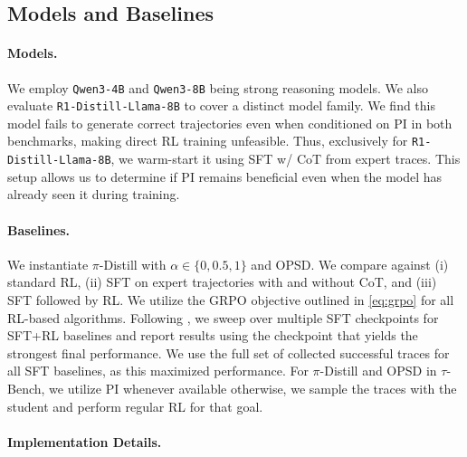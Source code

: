 \documentclass[]{servicenow} %
\begin{document}
 
\subsection{Models and Baselines}
\paragraph{Models.}We employ \texttt{Qwen3-4B} and \texttt{Qwen3-8B} \citep{yang2025qwen3technicalreport} being strong reasoning models. We also evaluate \texttt{R1-Distill-Llama-8B} to cover a distinct model family. We find this model fails to generate correct trajectories even when conditioned on PI in both benchmarks, making direct RL training unfeasible. Thus, exclusively for \texttt{R1-Distill-Llama-8B}, we warm-start it using SFT w/ CoT from expert traces. This setup allows us to determine if PI remains beneficial even when the model has already seen it during training.

\paragraph{Baselines.} We instantiate $\pi$-Distill with $\alpha \in \{0, 0.5, 1\}$ and OPSD. We compare against (i) standard RL, (ii) SFT on expert trajectories with and without CoT, and (iii) SFT followed by RL. We utilize the GRPO objective outlined in \cref{eq:grpo} for all RL-based algorithms. Following \citet{vattikonda2025trainllmwebagent}, we sweep over multiple SFT checkpoints for SFT+RL baselines and report results using the checkpoint that yields the strongest final performance. We use the full set of collected successful traces for all SFT baselines, as this maximized performance. For $\pi$-Distill and OPSD in $\tau$-Bench, we utilize PI whenever available otherwise, we sample the traces with the student and perform regular RL for that goal.




\paragraph{Implementation Details.} 
\end{document}
